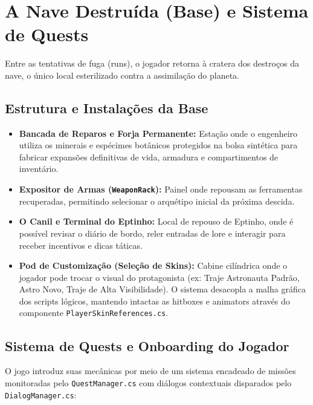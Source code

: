 \documentclass[a4paper,12pt]{report}
\begin{document}
\chapter{A Nave Destruída (Base) e Sistema de Quests}

Entre as tentativas de fuga (runs), o jogador retorna à cratera dos destroços da nave, o único local esterilizado contra a assimilação do planeta.

\section{Estrutura e Instalações da Base}
\begin{itemize}
    \item \textbf{Bancada de Reparos e Forja Permanente:} Estação onde o engenheiro utiliza os minerais e espécimes botânicos protegidos na bolsa sintética para fabricar expansões definitivas de vida, armadura e compartimentos de inventário.
    \item \textbf{Expositor de Armas (\texttt{WeaponRack}):} Painel onde repousam as ferramentas recuperadas, permitindo selecionar o arquétipo inicial da próxima descida.
    \item \textbf{O Canil e Terminal do Eptinho:} Local de repouso de Eptinho, onde é possível revisar o diário de bordo, reler entradas de lore e interagir para receber incentivos e dicas táticas.
    \item \textbf{Pod de Customização (Seleção de Skins):} Cabine cilíndrica onde o jogador pode trocar o visual do protagonista (ex: Traje Astronauta Padrão, Astro Novo, Traje de Alta Visibilidade). O sistema desacopla a malha gráfica dos scripts lógicos, mantendo intactas as hitboxes e animators através do componente \texttt{PlayerSkinReferences.cs}.
\end{itemize}

\section{Sistema de Quests e Onboarding do Jogador}
O jogo introduz suas mecânicas por meio de um sistema encadeado de missões monitoradas pelo \texttt{QuestManager.cs} com diálogos contextuais disparados pelo \texttt{DialogManager.cs}:
\end{document}
